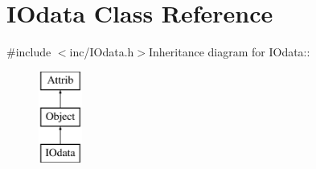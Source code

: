 \hypertarget{classIOdata}{
\section{IOdata Class Reference}
\label{classIOdata}
}


{\ttfamily \#include $<$inc/IOdata.h$>$}Inheritance diagram for IOdata::\begin{figure}[H]
\begin{center}
\leavevmode
\includegraphics[height=3cm]{classIOdata}
\end{center}
\end{figure}
